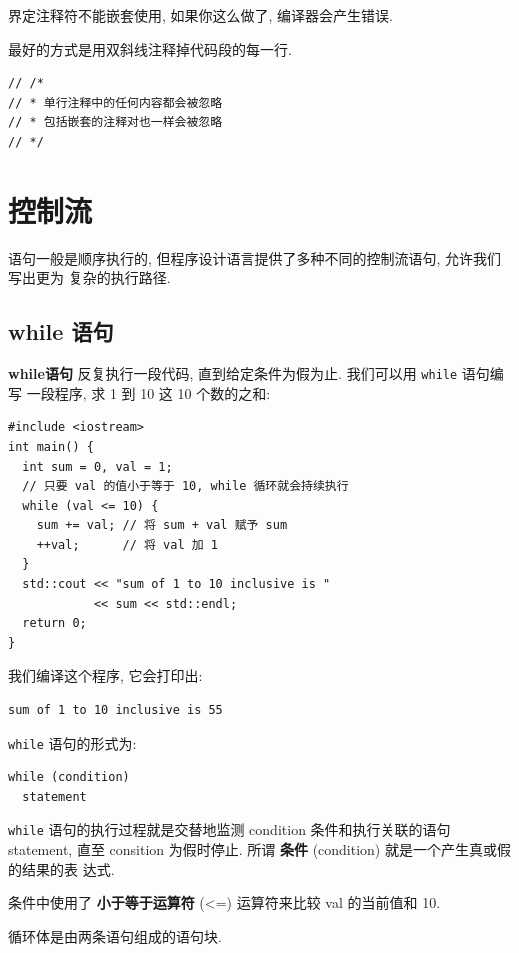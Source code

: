 \documentclass[lang=cn]{elegantbook}
\begin{document}
界定注释符不能嵌套使用, 如果你这么做了, 编译器会产生错误.

最好的方式是用双斜线注释掉代码段的每一行.

\begin{verbatim}
// /*
// * 单行注释中的任何内容都会被忽略
// * 包括嵌套的注释对也一样会被忽略
// */
\end{verbatim}

\section{控制流}
\label{sec:orgcaf50fa}

语句一般是顺序执行的, 但程序设计语言提供了多种不同的控制流语句, 允许我们写出更为
复杂的执行路径.

\subsection{while 语句}
\label{sec:org3ec64c5}

\textbf{while语句} 反复执行一段代码, 直到给定条件为假为止. 我们可以用 \texttt{while} 语句编写
一段程序, 求 1 到 10 这 10 个数的之和:

\begin{verbatim}
#include <iostream>
int main() {
  int sum = 0, val = 1;
  // 只要 val 的值小于等于 10, while 循环就会持续执行
  while (val <= 10) {
    sum += val; // 将 sum + val 赋予 sum
    ++val;      // 将 val 加 1
  }
  std::cout << "sum of 1 to 10 inclusive is "
            << sum << std::endl;
  return 0;
}
\end{verbatim}

我们编译这个程序, 它会打印出:

\begin{verbatim}
sum of 1 to 10 inclusive is 55
\end{verbatim}


\texttt{while} 语句的形式为:

\begin{verbatim}
while (condition)
  statement
\end{verbatim}

\texttt{while} 语句的执行过程就是交替地监测 condition 条件和执行关联的语句 statement,
直至 consition 为假时停止. 所谓 \textbf{条件} (condition) 就是一个产生真或假的结果的表
达式.

条件中使用了 \textbf{小于等于运算符} (<=) 运算符来比较 val 的当前值和 10.

循环体是由两条语句组成的语句块.
\end{document}
